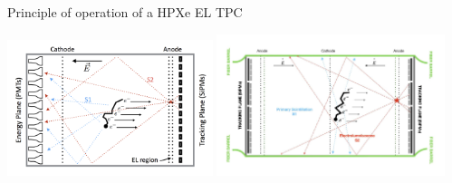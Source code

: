 \documentclass [aspectratio=169]{beamer}
\newcommand{\bbonu}{\ensuremath{\beta\beta0\nu}}
\newcommand{\XE}{\ensuremath{{}^{136}{\rm Xe}}}
\begin{document}


%
% 


\begin{frame}{Principle of operation of a HPXe EL TPC}

\includegraphics[width=0.45\textwidth]{PrincipleOfOperation.png}
\includegraphics[width=0.50\textwidth]{symetric.jpeg}

\end{frame}
\end{document}
